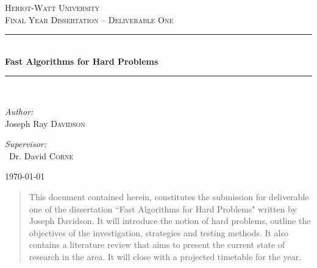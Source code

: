 \documentclass[11pt]{article}
\newcommand{\HRule}{\rule{\linewidth}{0.5mm}}
\theoremstyle{definition}
\begin{document}
  \begin{titlepage}

    \begin{center}


      \textsc{\LARGE Heriot-Watt University}\\[1.5cm]

      \textsc{\Large Final Year Dissertation -- Deliverable One }\\[0.5cm]


      \HRule \\[0.4cm]
      { \huge \bfseries Fast Algorithms for Hard Problems}\\[0.4cm]

      \HRule \\[1.5cm]

      \begin{minipage}{0.4\textwidth}
        \begin{flushleft} \large
          \emph{Author:}\\
          Joseph Ray \textsc{Davidson}
        \end{flushleft}
      \end{minipage}
      \begin{minipage}{0.4\textwidth}
        \begin{flushright} \large
          \emph{Supervisor:} \\
           ~Dr. David \textsc{Corne} 
        \end{flushright}
      \end{minipage}

      \vfill

      {\large \today}

    \end{center}

  \end{titlepage}

  \begin{abstract}
    This document contained herein, constitutes the submission for deliverable
    one of the dissertation ``Fast Algorithms for Hard Problems" written by
    Joseph Davidson. It will introduce the notion of hard problems, outline
    the objectives of the investigation, strategies and testing methods. It
    also contains a literature review that aims to present the current state
    of research in the area. It will close with a projected timetable for the year.

  \end{abstract}
  \newpage
\end{document}
